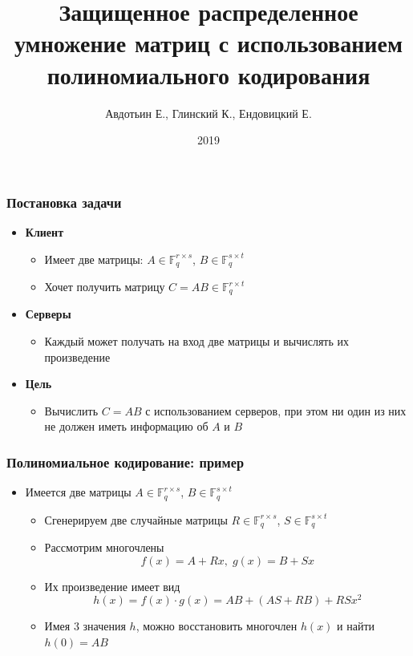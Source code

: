 \documentclass{beamer}
\title{Защищенное распределенное умножение матриц с использованием полиномиального кодирования}
\author{Авдотьин Е., Глинский К., Ендовицкий Е.}
\institute{МФТИ}
\date{2019}
\begin{document}
    
    \frame{\titlepage}

    \begin{frame}
        \frametitle{Постановка задачи}
        \begin{itemize}
            \item<1-> \textbf{Клиент}
            \begin{itemize}
                \item Имеет две матрицы: $A \in \mathbb{F}_q^{r\times s}$, $B \in \mathbb{F}_q^{s\times t}$
                \item Хочет получить матрицу $C = AB \in \mathbb{F}_q^{r \times t}$
            \end{itemize}
            \item<2-> \textbf{Серверы}
            \begin{itemize}
                \item Каждый может получать на вход две матрицы и вычислять их произведение
            \end{itemize}
            \item<3-> \textbf{Цель}
            \begin{itemize}
                \item Вычислить $C = AB$ с использованием серверов, при этом ни один из них не должен иметь информацию об $A$ и $B$
            \end{itemize}
        \end{itemize}
    \end{frame}

    \begin{frame}
        \frametitle{Полиномиальное кодирование: пример}
        \begin{itemize}
            \item Имеется две матрицы $A \in \mathbb{F}_q^{r\times s}$, $B \in \mathbb{F}_q^{s\times t}$
            \begin{itemize}
                \item<1-> Сгенерируем две случайные матрицы $R \in \mathbb{F}_q^{r\times s}$, $S \in \mathbb{F}_q^{s\times t}$
                \item<2-> Рассмотрим многочлены
                \begin{equation*}
                    f(x) = A + Rx, \; g(x) = B + Sx
                \end{equation*}
                \item<3-> Их произведение имеет вид
                \begin{equation*}
                    h(x) = f(x) \cdot g(x) = AB + \left(AS + RB\right) + RSx^2
                \end{equation*}
                \item<4-> Имея 3 значения $h$, можно восстановить многочлен $h(x)$ и найти $h(0) = AB$
            \end{itemize}
        \end{itemize}
    \end{frame}
\end{document}
